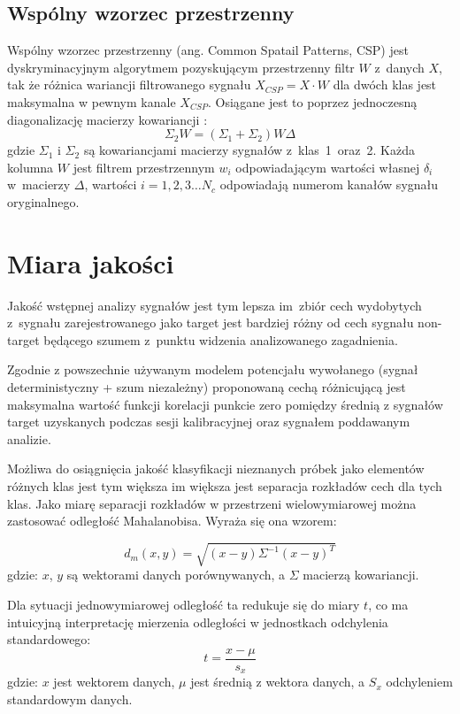 \documentclass[licencjacka,openright]{pracamgr}
\begin{document}
\subsection{Wspólny wzorzec przestrzenny}
Wspólny wzorzec przestrzenny (ang. Common Spatail Patterns, CSP) \citep{koles1990} jest dyskryminacyjnym algorytmem pozyskującym przestrzenny filtr $W$ z~danych $X$, tak że różnica wariancji filtrowanego sygnału \mbox{$X_{CSP} = X \cdot W$} dla dwóch klas jest maksymalna w pewnym kanale $X_{CSP}$. Osiągane jest to poprzez jednoczesną diagonalizację macierzy kowariancji \citep{samsek2012}:
\begin{equation}
\Sigma _2 W = (\Sigma _1 + \Sigma _2 )W \Delta
\end{equation}
gdzie $\Sigma_1$ i $\Sigma_2$ są kowariancjami macierzy sygnałów z~klas~1~oraz~2. Każda kolumna $W$ jest filtrem przestrzennym $w_i$ odpowiadającym wartości własnej $\delta _i$ w~macierzy $\Delta$, wartości $i = 1,2,3 \ldots N_c$ odpowiadają numerom kanałów sygnału oryginalnego.

\section{Miara jakości}
\label{miara}
Jakość wstępnej analizy sygnałów jest tym lepsza im~zbiór cech wydobytych z~sygnału zarejestrowanego jako target jest bardziej różny od cech sygnału non-target będącego szumem z~punktu widzenia analizowanego zagadnienia.

Zgodnie z powszechnie używanym modelem potencjału wywołanego (sygnał deterministyczny + szum niezależny) proponowaną cechą  różnicującą jest maksymalna wartość funkcji korelacji punkcie zero pomiędzy średnią z sygnałów target uzyskanych podczas sesji kalibracyjnej oraz sygnałem poddawanym analizie.

Możliwa do osiągnięcia jakość klasyfikacji nieznanych próbek jako elementów różnych klas jest tym większa im większa jest separacja rozkładów cech dla tych klas. Jako miarę separacji rozkładów w przestrzeni wielowymiarowej można zastosować odległość Mahalanobisa. Wyraża się ona wzorem:

\begin{equation}
d_{m}{(x,y)}=\sqrt{(x-y)\Sigma^{-1}(x-y)^T}
\end{equation}
gdzie: $x$, $y$ są wektorami danych porównywanych, a $\Sigma$ macierzą kowariancji.

Dla sytuacji jednowymiarowej odległość ta redukuje się do miary $t$, co ma intuicyjną interpretację mierzenia odległości w jednostkach odchylenia standardowego:
\begin{equation}
t = \frac{x-\mu}{s_x}
\end{equation}
gdzie: $x$ jest wektorem danych, $\mu$ jest średnią z wektora danych, a $S_x$ odchyleniem standardowym danych.
\end{document}
